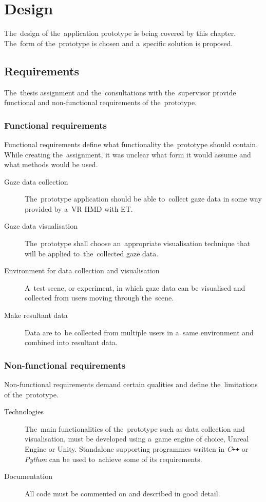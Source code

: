 \chapter{Design}
\begin{chapterabstract}
The~design of the~application prototype is being covered by this chapter. The~form of the~prototype is chosen and a~specific solution is proposed.
\end{chapterabstract}

\section{Requirements}
The~thesis assignment and the~consultations with the~supervisor provide functional and non-functional requirements of the~prototype. 

\subsection{Functional requirements}
Functional requirements define what functionality the~prototype should contain. While creating the~assignment, it was unclear what form it would assume and what methods would be used. 

\begin{description}
    \item[Gaze data collection] The~prototype application should be able to~collect gaze data in some way provided by a~VR HMD with ET.
    \item[Gaze data visualisation] The~prototype shall choose an~appropriate visualisation technique that will be applied to~the~collected gaze data.
    \item[Environment for data collection and visualisation] A~test scene, or experiment, in which gaze data can be visualised and collected from users moving through the~scene.
    \item[Make resultant data] Data are to~be collected from multiple users in a~same environment and combined into resultant data.
\end{description}

\subsection{Non-functional requirements}
Non-functional requirements demand certain qualities and define the~limitations of the~prototype.

\begin{description}
    \item[Technologies] The~main functionalities of the~prototype such as data collection and visualisation, must be developed using a~game engine of choice, Unreal Engine or Unity. Standalone supporting programmes written in \emph{C\texttt{++}} or \emph{Python} can be used to~achieve some of its requirements.
    \item[Documentation] All code must be commented on and described in good detail.
\end{description}


